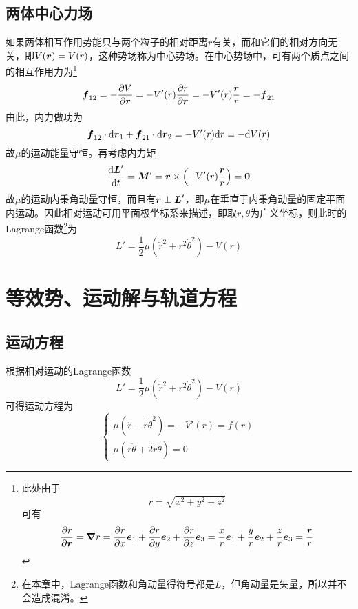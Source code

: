 \subsection{两体中心力场}

如果两体相互作用势能只与两个粒子的相对距离$r$有关，而和它们的相对方向无关，即$V(\boldsymbol{r}) = V(r)$，这种势场称为{\heiti 中心势场}。在中心势场中，可有两个质点之间的相互作用力为\footnote{此处由于\begin{equation*} r = \sqrt{x^2+y^2+z^2} \end{equation*}可有\begin{equation*} \frac{\partial r}{\partial \boldsymbol{r}} = \boldsymbol{\nabla} r = \frac{\partial r}{\partial x}{\boldsymbol{e}_1}+\frac{\partial r}{\partial y}{\boldsymbol{e}_2}+\frac{\partial r}{\partial z}{\boldsymbol{e}_3} = \frac{x}{r}\boldsymbol{e}_1 + \frac{y}{r}\boldsymbol{e}_2 + \frac{z}{r}\boldsymbol{e}_3 = \frac{\boldsymbol{r}}{r} \end{equation*}}
\begin{equation}
	\boldsymbol{f}_{12} = -\frac{\partial V}{\partial \boldsymbol{r}} = -V'(r) \frac{\partial r}{\partial \boldsymbol{r}} = -V'(r) \frac{\boldsymbol{r}}{r} = -\boldsymbol{f}_{21}
\end{equation}
由此，内力做功为
\begin{equation}
	\boldsymbol{f}_{12} \cdot \mathrm{d} \boldsymbol{r}_1 + \boldsymbol{f}_{21} \cdot \mathrm{d} \boldsymbol{r}_2 = -V'(r) \mathrm{d} r = -\mathrm{d} V(r)
\end{equation}
故$\mu$的运动能量守恒。再考虑内力矩
\begin{equation}
	\dfrac{\mathrm{d} \boldsymbol{L}'}{\mathrm{d} t} = \boldsymbol{M}' = \boldsymbol{r} \times \left(-V'(r) \frac{\boldsymbol{r}}{r}\right) = \boldsymbol{0}
\end{equation}
故$\mu$的运动内秉角动量守恒，而且有$\boldsymbol{r} \perp \boldsymbol{L}'$，即$\mu$在垂直于内秉角动量的固定平面内运动。因此相对运动可用平面极坐标系来描述，即取$r,\theta$为广义坐标，则此时的Lagrange函数\footnote{在本章中，Lagrange函数和角动量得符号都是$L$，但角动量是矢量，所以并不会造成混淆。}为
\begin{equation}
	L' = \frac12 \mu \left(\dot{r}^2 + r^2 \dot{\theta}^2\right) - V(r)
\end{equation}

\section{等效势、运动解与轨道方程}

\subsection{运动方程}

根据相对运动的Lagrange函数
\begin{equation*}
	L' = \frac12 \mu \left(\dot{r}^2 + r^2 \dot{\theta}^2\right) - V(r)
\end{equation*}
可得运动方程为
\begin{equation}
	\begin{cases}
		\displaystyle \mu \left(\ddot{r}-r\dot{\theta}^2\right) = -V'(r) = f(r) \\
		\displaystyle \mu \left(r\ddot{\theta} + 2\dot{r} \dot{\theta}\right) = 0
	\end{cases}
	\label{两体运动方程}
\end{equation}

